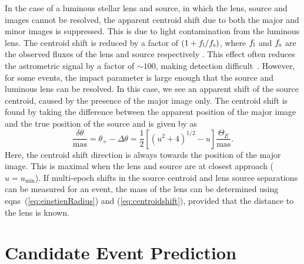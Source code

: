 \documentclass[fleqn,usenatbib]{mnras}
\newcommand{\Gaia}{{\it Gaia }}
\begin{document}
In the case of a luminous stellar lens and source, in which the lens, source and images cannot be resolved, the apparent centroid shift due to both the major and minor images is suppressed. This is due to light contamination from the luminous lens. The centroid shift is reduced by a factor of $(1+f_{\rm l}/f_{\rm s})$, where $f_{\rm l}$ and $f_{\rm s}$ are the observed fluxes of the lens and source respectively \citep{Dominik2000}. This effect often reduces the astrometric signal by a factor of $\sim100$, making detection difficult~\citep[e.g.,][]{Proft2011}. However, for some events, the impact parameter is large enough that the source and luminous lens can be resolved. In this case, we see an apparent shift of the source centroid, caused by the presence of the major image only. The centroid shift is found by taking the difference between the apparent position of the major image and the true position of the source and is given by \cite{Sahu2017} as
%
\begin{equation}
\frac{\delta\theta}{\text{mas}} = \theta_{+} - \Delta\theta = \frac{1}{2}\left[\left(u^{2}+4\right)^{1/2}-u\right]\frac{\Theta_{E}}{\text{mas}}.
\label{eq:centroidshift}
\end{equation}
%
Here, the centroid shift direction is always towards the position of the major image. This is maximal when the lens and source are at closest approach ($u=u_{\text{min}}$). If multi-epoch shifts in the source centroid and lens source separations can be measured for an event, the mass of the lens can be determined using eqns~(\ref{eq:einstienRadius}) and (\ref{eq:centroidshift}), provided that the distance to the lens is known.

\section{Candidate Event Prediction}

\end{document}
